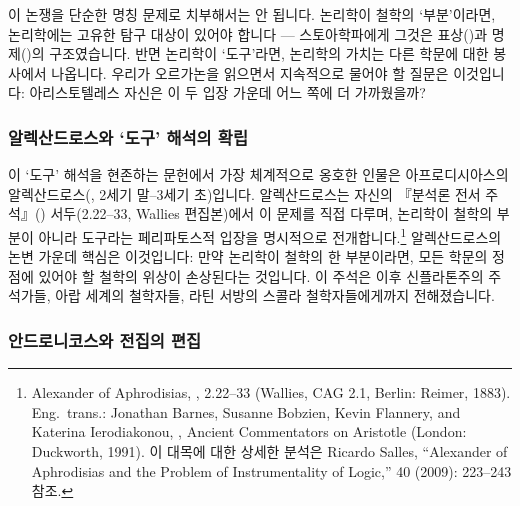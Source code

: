 \documentclass[12pt, a4paper]{article}
\begin{document}
이 논쟁을 단순한 명칭 문제로 치부해서는 안 됩니다. 논리학이 철학의 `부분'이라면, 논리학에는 고유한 탐구 대상이 있어야 합니다 --- 스토아학파에게 그것은 표상()과 명제()의 구조였습니다. 반면 논리학이 `도구'라면, 논리학의 가치는 다른 학문에 대한 봉사에서 나옵니다. 우리가 오르가논을 읽으면서 지속적으로 물어야 할 질문은 이것입니다: 아리스토텔레스 자신은 이 두 입장 가운데 어느 쪽에 더 가까웠을까?

\subsubsection{알렉산드로스와 `도구' 해석의 확립}

이 `도구' 해석을 현존하는 문헌에서 가장 체계적으로 옹호한 인물은 아프로디시아스의 알렉산드로스(, 2세기 말--3세기 초)입니다. 알렉산드로스는 자신의 『분석론 전서 주석』() 서두(2.22--33, Wallies 편집본)에서 이 문제를 직접 다루며, 논리학이 철학의 부분이 아니라 도구라는 페리파토스적 입장을 명시적으로 전개합니다.\footnote{Alexander of Aphrodisias, , 2.22--33 (Wallies, CAG 2.1, Berlin: Reimer, 1883). Eng.\ trans.: Jonathan Barnes, Susanne Bobzien, Kevin Flannery, and Katerina Ierodiakonou, , Ancient Commentators on Aristotle (London: Duckworth, 1991). 이 대목에 대한 상세한 분석은 Ricardo Salles, ``Alexander of Aphrodisias and the Problem of Instrumentality of Logic,''  40 (2009): 223--243 참조.} 알렉산드로스의 논변 가운데 핵심은 이것입니다: 만약 논리학이 철학의 한 부분이라면, 모든 학문의 정점에 있어야 할 철학의 위상이 손상된다는 것입니다. 이 주석은 이후 신플라톤주의 주석가들, 아랍 세계의 철학자들, 라틴 서방의 스콜라 철학자들에게까지 전해졌습니다.

\subsubsection{안드로니코스와 전집의 편집}
\end{document}
